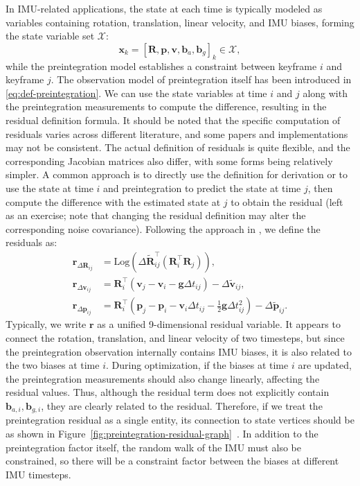 In IMU-related applications, the state at each time is typically modeled as variables containing rotation, translation, linear velocity, and IMU biases, forming the state variable set $\mathcal{X}$:
\begin{equation}\label{key}
	\mathbf{x}_k = \left[ \mathbf{R}, \mathbf{p}, \mathbf{v}, \mathbf{b}_a, \mathbf{b}_g \right]_k \in \mathcal{X},
\end{equation}
while the preintegration model establishes a constraint between keyframe $i$ and keyframe $j$. The observation model of preintegration itself has been introduced in \eqref{eq:def-preintegration}. We can use the state variables at time $i$ and $j$ along with the preintegration measurements to compute the difference, resulting in the residual definition formula. It should be noted that the specific computation of residuals varies across different literature, and some papers and implementations may not be consistent. The actual definition of residuals is quite flexible, and the corresponding Jacobian matrices also differ, with some forms being relatively simpler. A common approach is to directly use the definition for derivation or to use the state at time $i$ and preintegration to predict the state at time $j$, then compute the difference with the estimated state at $j$ to obtain the residual (left as an exercise; note that changing the residual definition may alter the corresponding noise covariance). Following the approach in \cite{Forster2015}, we define the residuals as:
\begin{subequations}
	\label{eq:def-of-preintegration-residuals}
	\begin{align}
		\mathbf{r}_{\Delta \mathbf{R}_{ij}} &= \mathrm{Log} \left(\Delta \tilde{\mathbf{R}}_{ij}^\top 
		\left(\mathbf{R}_i^\top \mathbf{R}_j \right)\right), \\
		\mathbf{r}_{\Delta \mathbf{v}_{ij}} &= \mathbf{R}_i^\top \left(\mathbf{v}_j - \mathbf{v}_i - \mathbf{g} \Delta t_{ij} \right) - \Delta 
		\tilde{\mathbf{v}}_{ij}, \\
		\mathbf{r}_{\Delta \mathbf{p}_{ij}} &= \mathbf{R}_i^\top \left(\mathbf{p}_j - \mathbf{p}_i - \mathbf{v}_i \Delta t_{ij} - 
		\frac{1}{2}\mathbf{g} \Delta t_{ij}^2 \right) - \Delta \tilde{\mathbf{p}}_{ij}.
	\end{align}
\end{subequations}
Typically, we write $\mathbf{r}$ as a unified 9-dimensional residual variable. It appears to connect the rotation, translation, and linear velocity of two timesteps, but since the preintegration observation internally contains IMU biases, it is also related to the two biases at time $i$. During optimization, if the biases at time $i$ are updated, the preintegration measurements should also change linearly, affecting the residual values. Thus, although the residual term does not explicitly contain $\mathbf{b}_{a,i}, \mathbf{b}_{g,i}$, they are clearly related to the residual. Therefore, if we treat the preintegration residual as a single entity, its connection to state vertices should be as shown in Figure~\ref{fig:preintegration-residual-graph}~. In addition to the preintegration factor itself, the random walk of the IMU must also be constrained, so there will be a constraint factor between the biases at different IMU timesteps.

